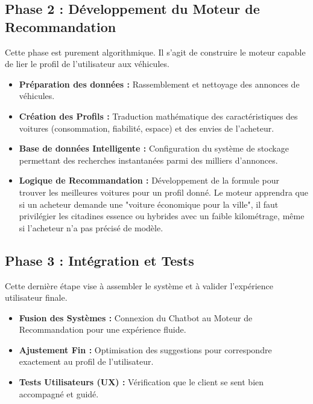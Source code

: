 \documentclass[a4paper, 11pt]{article}
\begin{document}
\vspace{0.2cm}
\subsection*{Phase 2 : Développement du Moteur de Recommandation}
Cette phase est purement algorithmique. Il s'agit de construire le moteur capable de lier le profil de l'utilisateur aux véhicules.
\begin{itemize}[label=\textbullet]
    \item \textbf{Préparation des données :} Rassemblement et nettoyage des annonces de véhicules.
    \item \textbf{Création des Profils :} Traduction mathématique des caractéristiques des voitures (consommation, fiabilité, espace) et des envies de l'acheteur.
    \item \textbf{Base de données Intelligente :} Configuration du système de stockage permettant des recherches instantanées parmi des milliers d'annonces.
    \item \textbf{Logique de Recommandation :} Développement de la formule pour trouver les meilleures voitures pour un profil donné. Le moteur apprendra que si un acheteur demande une "voiture économique pour la ville", il faut privilégier les citadines essence ou hybrides avec un faible kilométrage, même si l'acheteur n'a pas précisé de modèle.
\end{itemize}

\vspace{0.2cm}
\newpage
\subsection*{Phase 3 : Intégration et Tests}
Cette dernière étape vise à assembler le système et à valider l'expérience utilisateur finale.
\begin{itemize}[label=\textbullet]
    \item \textbf{Fusion des Systèmes :} Connexion du Chatbot au Moteur de Recommandation pour une expérience fluide.
    \item \textbf{Ajustement Fin :} Optimisation des suggestions pour correspondre exactement au profil de l'utilisateur.
    \item \textbf{Tests Utilisateurs (UX) :} Vérification que le client se sent bien accompagné et guidé.
\end{itemize}

\vspace{0.2cm}
\end{document}
